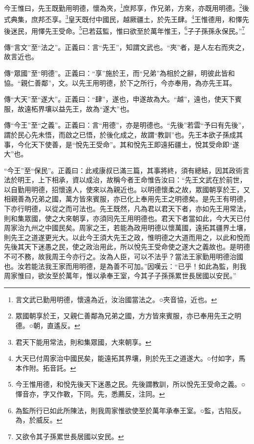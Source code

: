 今王惟曰，先王既勤用明德，懷為夾，\footnote{言文武已勤用明德，懷遠為近，汝治國當法之。○夾音協，近也。}庶邦享，作兄弟，方來，亦既用明德。\footnote{眾國朝享於王，又親仁善鄰為兄弟之國，方方皆來賓服，亦已奉用先王之明德。○朝，直遙反。}後式典集，庶邦丕享。\footnote{君天下能用常法，則和集眾國，大來朝享。}皇天既付中國民，越厥疆土，於先王肆。\footnote{大天已付周家治中國民矣，能遠拓其界壤，則於先王之道遂大。○付如字，馬本作附。拓音託。}王惟德用，和懌先後迷民，用懌先王受命。\footnote{今王惟用德，和悅先後天下迷愚之民。先後謂教訓，所以悅先王受命之義。○懌音亦，字又作斁，下同。先，悉薦反，注同。}已若茲監，惟曰欲至於萬年惟王，\footnote{為監所行已如此所陳法，則我周家惟欲使至於萬年承奉王室。○監，古陷反。為，於威反。}子子孫孫永保民。”\footnote{又欲令其子孫累世長居國以安民。}

{\noindent\zhuan{}\fzbyks 傳“言文”至“法之”。正義曰：言“先王”，知謂文武也。“夾”者，是人左右而夾之，故言近也。 \par}

{\noindent\zhuan{}\fzbyks 傳“眾國”至“明德”。正義曰：“享”施於王，而“兄弟”為相於之辭，明彼此皆和協。“親仁善鄰”，文。以先王用明德，於下之所行，今亦奉用，為亦先王耳。 \par}

{\noindent\zhuan{}\fzbyks 傳“大天”至“遂大”。正義曰：“肆”，遂也，申遂故為大。“越”，遠也，使天下賓服，故遠柘界壤以益先王，故為“遂大”也。 \par}

{\noindent\zhuan{}\fzbyks 傳“今王”至“之義”。正義曰：言“用德”，亦是明德也。“先後”若雲“予曰有先後”，謂於民心先未悟，而啟之已悟，於後化成之，故謂“教訓”也。先王本欲子孫成其事，今化天下使善，是“悅先王受命”。其和悅先王即遠拓疆土，悅其受命即“遂大”也。 \par}

{\noindent\shu{}\fzkt “今王”至“保民”。正義曰：此戒康叔已滿三篇，其事將終，須有總結，因其政術言法於明王，上下相承，資以成治，故稱今者王命惟告汝曰：“先王文武在於前世，以自勤用明德，招懷遠人，使來以為親近也。以明德懷柔之故，眾國朝享於王，又相親善為兄弟之國，萬方皆來賓服，亦已化上奉用先王之明德矣。是先王有明德，下亦行明德，以從之而可法也。先王既然，凡為君以君天下者，亦如先王用常法，則和集眾國，使之大來朝享，亦須同先王用明德也。君天下者當如此，今大天已付周家治九州之中國民矣。周家之王，若能為政用明德以懷萬國，遠拓其疆界土壤，則先王之道遂更光大。以此今王須大先王之政，惟明德之大道而用之，以此和悅而先後其天下迷愚之民，使之政治用此，所以悅先王受命使之遂大之義故也。是明德不可不務，故我周王今亦行之。汝為人臣，可以不法乎？當法王家勤用明德治國也。汝若能法我王家而用明德，是為善不可加。”因嘆云：“已乎！如此為監，則我周家惟曰，欲汝至於萬年，惟以承奉王室，今其子子孫孫累世長居國以安民。” \par}

